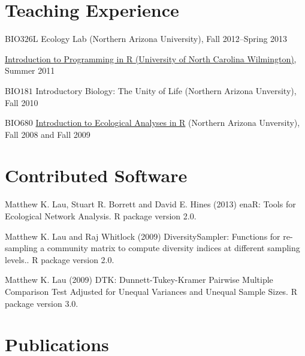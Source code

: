 \documentclass[letterpaper]{article}
\renewenvironment{itemize}{
  \begin{list}{}{
    \setlength{\leftmargin}{1em}
  }
}{
  \end{list}
}
\begin{document}
\section*{Teaching Experience}
\begin{itemize}
\item BIO$326$L Ecology Lab (Northern Arizona University), Fall 2012--Spring 2013
\item \href{http://people.uncw.edu/borretts/courses/RworkshopUNCW.pdf}{Introduction to Programming in R (University of North Carolina
  Wilmington)}, Summer 2011
\item BIO$181$ Introductory Biology: The Unity of Life (Northern
  Arizona Unversity), Fall 2010
\item BIO68$0$
  \href{http://www.mpcer.nau.edu/igert/eco_analysis_r.html}{Introduction
    to Ecological Analyses in R} (Northern Arizona Unversity), Fall
  2008 and Fall 2009
\end{itemize}

\section*{Contributed Software}
\begin{description}

\item{Matthew K. Lau, Stuart R. Borrett and David E. Hines (2013)
  enaR: Tools for Ecological Network Analysis. R package version 2.0.}

\item{Matthew K. Lau and Raj Whitlock (2009) DiversitySampler: Functions for re-sampling a community matrix to compute diversity indices at different sampling levels.. R package version 2.0.}

\item{Matthew K. Lau (2009) DTK: Dunnett-Tukey-Kramer Pairwise Multiple
  Comparison Test Adjusted for Unequal Variances and Unequal Sample Sizes. R
  package version 3.0.}

\end{description}


\section*{Publications}
\end{document}
